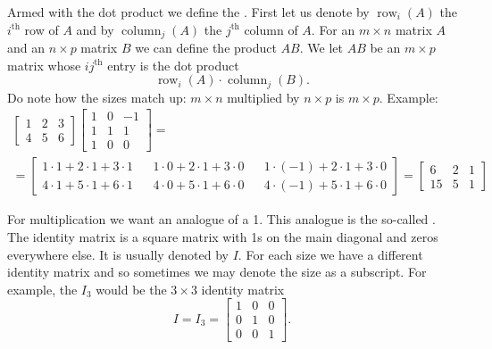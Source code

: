 Armed with the dot product we define the
\emph{}.
First let us denote by $\operatorname{row}_i(A)$ the $i^{\text{th}}$ row
of $A$ and by
$\operatorname{column}_j(A)$ the $j^{\text{th}}$ column of $A$.
For an $m \times n$ matrix $A$ and an $n \times p$ matrix $B$
we can define the product $AB$.  We let $AB$ be an $m \times p$
matrix whose $ij^{\text{th}}$ entry is the dot product
\begin{equation*}
\operatorname{row}_i(A) \cdot
\operatorname{column}_j(B) .
\end{equation*}
Do note how the sizes match up: $m \times n$ multiplied by $n \times p$ is 
$m \times p$.  Example:
\begin{multline*}
\begin{bmatrix}
1 & 2 & 3 \\
4 & 5 & 6
\end{bmatrix}
\begin{bmatrix}
1 & 0 & -1 \\
1 & 1 & 1 \\
1 & 0 & 0
\end{bmatrix}
= \\ =
\begin{bmatrix}
1\cdot 1 + 2\cdot 1 + 3 \cdot 1 &  &
1\cdot 0 + 2\cdot 1 + 3 \cdot 0 &  &
1\cdot (-1) + 2\cdot 1 + 3 \cdot 0 \\
4\cdot 1 + 5\cdot 1 + 6 \cdot 1 &  &
4\cdot 0 + 5\cdot 1 + 6 \cdot 0 &  &
4\cdot (-1) + 5\cdot 1 + 6 \cdot 0
\end{bmatrix}
=
\begin{bmatrix}
6 & 2 & 1 \\
15 & 5 & 1
\end{bmatrix}
\end{multline*}

\medskip

For multiplication we want an analogue of a 1.  This analogue is the
so-called \emph{}.
The identity matrix is a square matrix with 1s on the
main diagonal and zeros everywhere else.  It is usually denoted by $I$.
For each size we have a different identity matrix and so sometimes we may denote
the size as a subscript.  For example, the $I_3$ would be the $3 \times 3$
identity matrix
\begin{equation*}
I = I_3 =
\begin{bmatrix}
1 & 0 & 0 \\
0 & 1 & 0 \\
0 & 0 & 1
\end{bmatrix} .
\end{equation*}

